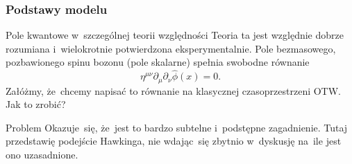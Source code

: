 \documentclass{beamer}  %
\begin{document}
\begin{frame}
  \frametitle{Podstawy modelu}

  \begin{block}{Pole kwantowe w~szczególnej teorii względności}
    Teoria ta jest względnie dobrze rozumiana i~wielokrotnie
    potwierdzona eksperymentalnie. Pole bezmasowego, pozbawionego
    spinu bozonu (pole skalarne) spełnia swobodne równanie
    \begin{equation}
      \label{eq:HawkingPromieniowanie-01}
      \eta^{ \mu \nu } \partial_{ \mu } \partial_{ \nu } \widehat{ \phi }( x )
      = 0.
    \end{equation}
    Załóżmy, że~chcemy napisać to równanie na klasycznej
    czasoprzestrzeni OTW. Jak to zrobić?
  \end{block}

  \begin{block}{Problem}
    Okazuje~się, że~jest to bardzo subtelne i~podstępne zagadnienie.
    Tutaj przedstawię podejście Hawkinga, nie wdając~się zbytnio
    w~dyskusję na~ile jest ono uzasadnione.
  \end{block}

\end{frame}
\end{document}
